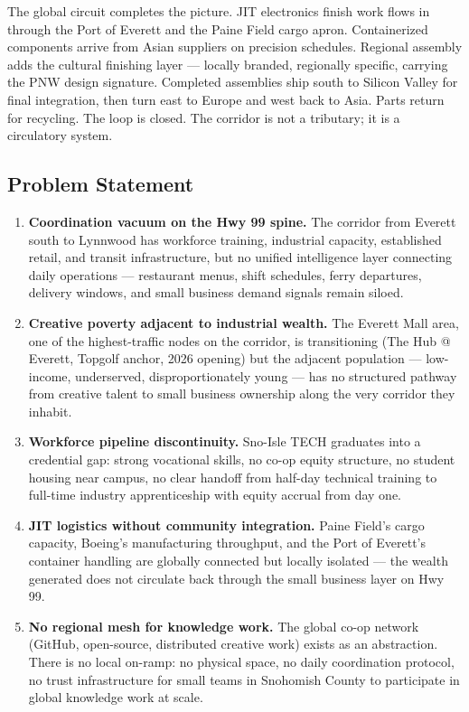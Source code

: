 \documentclass[11pt,letterpaper]{article}
\begin{document}
The global circuit completes the picture. JIT electronics finish work flows in through the Port of Everett and the Paine Field cargo apron. Containerized components arrive from Asian suppliers on precision schedules. Regional assembly adds the cultural finishing layer --- locally branded, regionally specific, carrying the PNW design signature. Completed assemblies ship south to Silicon Valley for final integration, then turn east to Europe and west back to Asia. Parts return for recycling. The loop is closed. The corridor is not a tributary; it is a circulatory system.

\subsection{Problem Statement}

\begin{enumerate}[leftmargin=*, label=\textbf{P\arabic*.}]
  \item \textbf{Coordination vacuum on the Hwy 99 spine.} The corridor from Everett south to Lynnwood has workforce training, industrial capacity, established retail, and transit infrastructure, but no unified intelligence layer connecting daily operations --- restaurant menus, shift schedules, ferry departures, delivery windows, and small business demand signals remain siloed.

  \item \textbf{Creative poverty adjacent to industrial wealth.} The Everett Mall area, one of the highest-traffic nodes on the corridor, is transitioning (The Hub @ Everett, Topgolf anchor, 2026 opening) but the adjacent population --- low-income, underserved, disproportionately young --- has no structured pathway from creative talent to small business ownership along the very corridor they inhabit.

  \item \textbf{Workforce pipeline discontinuity.} Sno-Isle TECH graduates into a credential gap: strong vocational skills, no co-op equity structure, no student housing near campus, no clear handoff from half-day technical training to full-time industry apprenticeship with equity accrual from day one.

  \item \textbf{JIT logistics without community integration.} Paine Field's cargo capacity, Boeing's manufacturing throughput, and the Port of Everett's container handling are globally connected but locally isolated --- the wealth generated does not circulate back through the small business layer on Hwy 99.

  \item \textbf{No regional mesh for knowledge work.} The global co-op network (GitHub, open-source, distributed creative work) exists as an abstraction. There is no local on-ramp: no physical space, no daily coordination protocol, no trust infrastructure for small teams in Snohomish County to participate in global knowledge work at scale.
\end{enumerate}
\end{document}
